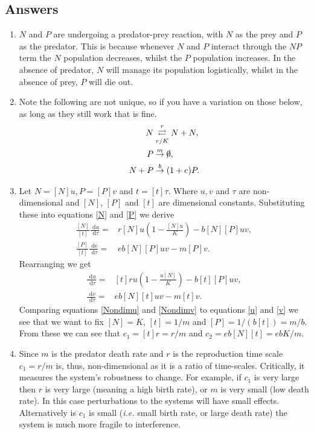 \documentclass[10pt]{article}
\newcommand{\rd}{\text{ d}}
\newcommand{\eqns}[2]{equations \eqref{#1} and \eqref{#2}}
\newcommand{\ie}{\emph{i.e.} }
\renewcommand{\l}{\left(}
\renewcommand{\r}{\right)}
\begin{document}
\begin{Answ}
\subsection{Answers}
\begin{enumerate}
\item $N$ and $P$ are undergoing a predator-prey reaction, with $N$ as the prey and $P$ as the predator. This is because whenever $N$ and $P$ interact through the $NP$ term the $N$ population decreases, whilst the $P$ population increases. In the absence of predator, $N$ will manage its population logistically, whilst in the absence of prey, $P$ will die out.
\item Note the following are not unique, so if you have a variation on those below, as long as they still work that is fine.
\begin{align}
N&\mathrel{\mathop{\rightleftarrows}^{r}_{r/K}}N+N,\\
P&\stackrel{m}{\rightarrow}\slashed{0},\\
N+P&\stackrel{b}{\rightarrow}(1+e)P.
\end{align}
\item Let $N=[N]u, P=[P]v$ and $t=[t]\tau$. Where $u,v$ and $\tau$ are non-dimensional and $[N]$, $[P]$ and $[t]$ are dimensional constants. Substituting these into \eqns{N}{P} we derive
\begin{align}
\frac{[N]}{[t]}\frac{\rd u}{\rd \tau} =&r[N]u\l 1- \frac{[N]u}{K}\r-b[N][P]uv,\label{NondimN}\\
\frac{[P]}{[t]}\frac{\rd v}{\rd \tau} =&eb[N][P]uv-m[P]v.\label{NondimP}
\end{align}
Rearranging we get
\begin{align}
\frac{\rd u}{\rd \tau} =&[t]ru\l 1- \frac{u[N]}{K}\r-b[t][P]uv,\label{Nondimu}\\
\frac{\rd v}{\rd \tau} =&eb[N][t]uv-m[t]v.\label{Nondimv}
\end{align}
Comparing \eqns{Nondimu}{Nondimv} to \eqns{u}{v} we see that we want to fix $[N]=K$, $[t]=1/m$ and $[P]=1/(b[t])=m/b$. From these we can see that $c_1=[t]r=r/m$ and $c_2=eb[N][t]=ebK/m$.
\item Since $m$ is the predator death rate and $r$ is the reproduction time scale $c_1=r/m$ is, thus, non-dimensional as it is a ratio of time-scales. Critically, it measures the system's robustness to change. For example, if $c_1$ is very large then $r$ is very large (meaning a high birth rate), or $m$ is very small (low death rate). In this case perturbations to the systems will have small effects. Alternatively is $c_1$ is small (\ie small birth rate, or large death rate) the system is much more fragile to interference.


\end{enumerate}
\end{Answ}
\end{document}
